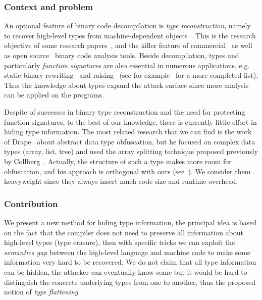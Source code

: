\documentclass[compsoc,conference,a4paper,10pt,times]{IEEEtran}
\begin{document}
\subsubsection*{Context and problem}
An optional feature of binary code decompilation is \emph{type reconstruction}, namely to recover high-level types from machine-dependent
objects~\cite{mycroft_type-based_1999, van_emmerik_static_2007}. This is the research objective of some
research papers~\cite{lee_tie_2011,elwazeer_scalable_2013,robbins_minx_2016,noonan_polymorphic_2016},
and the killer feature of commercial~\cite{noauthor_hex-rays_nodate,noauthor_jeb_nodate}
as well as open source~\cite{noauthor_ghidra_nodate} binary code analysis tools. Beside decompilation,
types and particularly \emph{function signatures} are also essential in numerous applications,
e.g. static binary rewriting~\cite{bernat_anywhere_2011,anand_compiler-level_2013} and
raising~\cite{yadavalli_raising_2019,goodman_lifting_2018} (see for
example~\cite{caballero_type_2016} for a more completed list). Thus the knowledge about types
expand the attack surface since more analysis can be applied on the programs.

Despite of successes in binary type reconstruction and the need for protecting function signatures, to the best
of our knowledge, there is currently little effort in hiding type information. The most related research that we
can find is the work of Drape~\cite{drape_generalising_2007,drape_obfuscation_2004,drape_obfuscation_2006}
about abstract data type obfuscation, but he focused on complex data types (array, list, tree) and used
the array splitting technique proposed previously by Collberg~\cite{collberg_taxonomy_1997}.
Actually, the structure of such a
type makes more room for obfuscation, and his approach is orthogonal with ours (see~).
We consider them heavyweight since they always insert much code size and runtime overhead.

\subsubsection*{Contribution}
We present a new method for hiding type information, the principal idea is based on the fact that the compiler does not need to preserve all information
about high-level types (type erasure), then with specific tricks we can exploit the \emph{semantics gap} between
the high-level language and machine code to make some information very hard
to be recovered. We do not claim that all type information can be hidden, the attacker can
eventually know some but it would be hard to distinguish the concrete underlying types from one to another,
thus the proposed notion of \emph{type flattening}.
\end{document}
